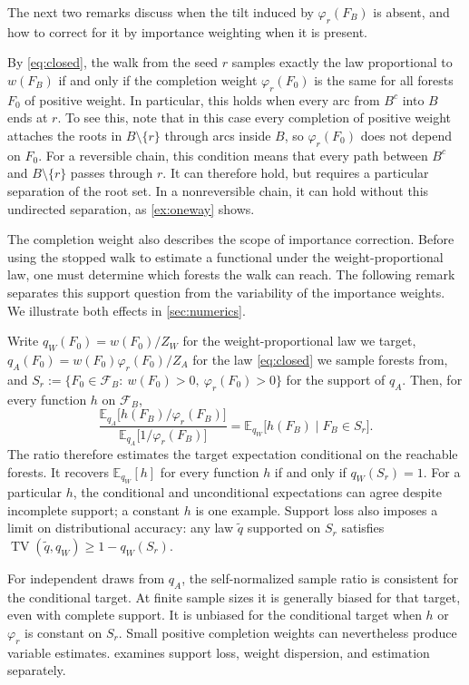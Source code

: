 \documentclass[onefignum,onetabnum]{siamart250211}
\numberwithin{theorem}{section}
\numberwithin{equation}{section}
\newcommand{\Fset}{\mathcal{F}}
\providecommand{\E}{}\renewcommand{\E}{\mathbb{E}}
\DeclareMathOperator{\TV}{TV}
\begin{document}
The next two remarks discuss when the tilt induced by $\varphi_r(F_B)$ is
absent, and how to correct for it by importance weighting when it is
present.

\begin{remark}\label{rem:unbiased}
By \eqref{eq:closed}, the walk from the seed $r$ samples
exactly the law proportional to $w(F_B)$ if and only if the completion
weight $\varphi_r(F_0)$ is the same for all forests $F_0$ of positive
weight. In particular, this holds when every arc from $B^c$ into $B$
ends at $r$. To see this, note that in this case every completion of
positive weight attaches the roots in $B\setminus\{r\}$ through arcs
inside $B$, so $\varphi_r(F_0)$ does not depend on $F_0$. For a reversible
chain, this condition means that every path between $B^c$ and
$B\setminus\{r\}$ passes through $r$. It can therefore hold, but
requires a particular separation of the root set. In a nonreversible
chain, it can hold without this undirected separation, as
\cref{ex:oneway} shows.

\end{remark}

The completion weight also describes the scope of importance
correction. Before using the stopped walk to estimate a functional
under the weight-proportional law, one must determine which forests
the walk can reach. The following remark separates this support
question from the variability of the importance weights. We
illustrate both effects in \cref{sec:numerics}.

\begin{remark}\label{rem:importance}
Write $q_W(F_0)=w(F_0)/Z_W$ for the weight-proportional law we target,
$q_A(F_0)=w(F_0)\varphi_r(F_0)/Z_A$ for the law \eqref{eq:closed} we
sample forests from, and
$S_r:=\{F_0\in\Fset_B:\ w(F_0)>0,\ \varphi_r(F_0)>0\}$ for the support of
$q_A$. Then, for every function $h$ on $\Fset_B$,
\[
\frac{\E_{q_A}\big[h(F_B)/\varphi_r(F_B)\big]}{\E_{q_A}\big[1/\varphi_r(F_B)\big]}
=\E_{q_W}\big[h(F_B)\mid F_B\in S_r\big].
\]
The ratio therefore estimates the target expectation conditional on
the reachable forests. It recovers $\E_{q_W}[h]$ for every function
$h$ if and only if $q_W(S_r)=1$. For a particular $h$, the conditional
and unconditional expectations can agree despite incomplete support;
a constant $h$ is one example. Support loss also imposes a limit on
distributional accuracy: any law $\widetilde q$ supported on $S_r$
satisfies $\TV(\widetilde q,q_W)\ge 1-q_W(S_r)$.

For independent draws from $q_A$, the self-normalized sample ratio is
consistent for the conditional target. At finite sample sizes it is
generally biased for that target, even with complete support. It is
unbiased for the conditional target when $h$ or $\varphi_r$ is
constant on $S_r$. Small positive completion weights can nevertheless
produce variable estimates.  examines support loss,
weight dispersion, and estimation separately.


\end{remark}
\end{document}

